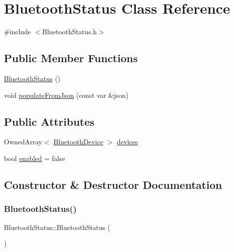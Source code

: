 \hypertarget{classBluetoothStatus}{}\section{Bluetooth\+Status Class Reference}
\label{classBluetoothStatus}


{\ttfamily \#include $<$Bluetooth\+Status.\+h$>$}

\subsection*{Public Member Functions}
\begin{DoxyCompactItemize}
\item 
\mbox{\hyperlink{classBluetoothStatus_a8e9ae9d1fa087ee59980e418568e4bb5}{Bluetooth\+Status}} ()
\item 
void \mbox{\hyperlink{classBluetoothStatus_ae3cf682d24f5adf760e03f3169ddacea}{populate\+From\+Json}} (const var \&json)
\end{DoxyCompactItemize}
\subsection*{Public Attributes}
\begin{DoxyCompactItemize}
\item 
Owned\+Array$<$ \mbox{\hyperlink{classBluetoothDevice}{Bluetooth\+Device}} $>$ \mbox{\hyperlink{classBluetoothStatus_a64a256084edf2aa6526f71a5b2e5a0a8}{devices}}
\item 
bool \mbox{\hyperlink{classBluetoothStatus_a8d00a127b71ffc93e953072c251d5592}{enabled}} = false
\end{DoxyCompactItemize}


\subsection{Constructor \& Destructor Documentation}
\mbox{\label{classBluetoothStatus_a8e9ae9d1fa087ee59980e418568e4bb5}} 
\subsubsection{\texorpdfstring{Bluetooth\+Status()}{BluetoothStatus()}}
{\footnotesize\ttfamily Bluetooth\+Status\+::\+Bluetooth\+Status (\begin{DoxyParamCaption}{ }\end{DoxyParamCaption})}




